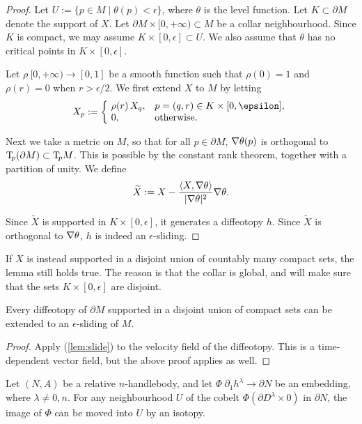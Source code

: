 \begin{proof}
Let $U:=\{p\in M\mid \theta(p)<\epsilon\}$, 
where $\theta$ is the level function.
Let $K\subset\partial M$ denote the support of $X$.
Let $\partial M\times[0,+\infty)\subset M$ be a collar neighbourhood.
Since $K$ is compact,
we may assume $K\times[0,\epsilon]\subset U$.
We also assume that $\theta$ has no critical points in $K\times[0,\epsilon]$.

Let $\rho\:[0,+\infty)\to[0,1]$ be a smooth function such that
$\rho(0)=1$ and $\rho(r)=0$ when $r>\epsilon/2$.
We first extend $X$ to $M$ by letting
\[ X_p:=\biggl\{\mkern-3mu\begin{array}{ll}
\rho(r)\,X_q,&p=(q,r)\in K\times[0,\epsilon],\\
0,&\text{otherwise}.
\end{array} \]

Next we take a metric on $M$,
so that for all $p\in\partial M$, $\nabla \theta(p)$ is orthogonal to $\mathrm{T}\!_p(\partial M)\subset\mathrm{T}\!_pM$.
This is possible by the constant rank theorem,
together with a partition of unity.
We define 
\[ \widetilde X:=X-\frac{\langle X,\nabla \theta\rangle}{|\nabla \theta|^2}\nabla \theta. \]

Since $\widetilde X$ is supported in $K\times[0,\epsilon]$,
it generates a diffeotopy $h$.
Since $\widetilde X$ is orthogonal to $\nabla\theta$,
$h$ is indeed an $\epsilon$-sliding. 
\end{proof}

\begin{remark}
If $X$ is instead supported in a disjoint union of countably many compact sets,
the lemma still holds true.
The reason is that the collar is global,
and will make sure that the sets $K\times[0,\epsilon]$ are disjoint.
\end{remark}

\begin{corollary}\label{cor:slide}
Every diffeotopy of $\partial M$ supported in
a disjoint union of compact sets 
can be extended to an $\epsilon$-sliding of $M$.
\end{corollary}

\begin{proof}
Apply (\ref{lem:slide}) to the velocity field of the diffeotopy.
This is a time-dependent vector field,
but the above proof applies as well.
\end{proof}

\begin{lemma}\label{lem:shrink}
    Let $(N,A)$ be a relative $n$-handlebody, 
    and let $\Phi\:\partial_1h^\lambda\to\partial N$ be an embedding,
    where $\lambda\neq0,n$.
    For any neighbourhood $U$ of the cobelt $\Phi(\partial D^\lambda\times0)$ in $\partial N$,
    the image of $\Phi$ can be moved into $U$ by an isotopy.
\end{lemma}
    
